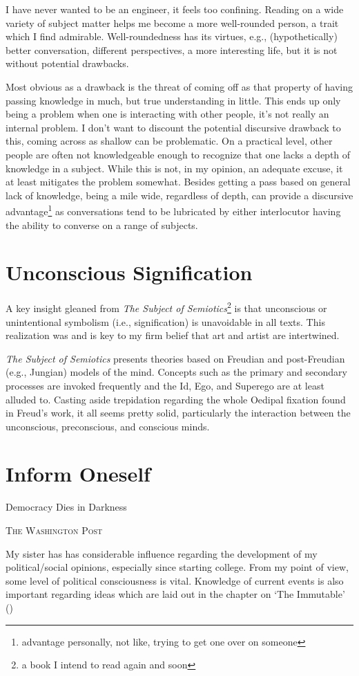 \documentclass[../butidigress.tex]{subfiles}
\begin{document}
I have never wanted to be  an engineer, it feels too confining.
Reading on a wide variety of subject matter helps me become a more well-rounded person, a trait which I find admirable.
Well-roundedness has its virtues, e.g., (hypothetically) better conversation, different perspectives, a more interesting life, but it is not without potential drawbacks.

Most obvious as a drawback is the threat of coming off as  that property of having passing knowledge in much, but true understanding in little.
This ends up only being a problem when one is interacting with other people, it's not really an internal problem.
I don't want to discount the potential discursive drawback to this, coming across as shallow can be problematic.
On a practical level, other people are often not knowledgeable enough to recognize that one lacks a depth of knowledge in a subject.
While this is not, in my opinion, an adequate excuse, it at least mitigates the problem somewhat.
Besides getting a pass based on general lack of knowledge, being a mile wide, regardless of depth, can provide a discursive advantage\footnote{advantage personally, not like, trying to get one over on someone} as conversations tend to be lubricated by either interlocutor having the ability to converse on a range of subjects.

\section{Unconscious Signification}
A key insight gleaned from \textit{The Subject of Semiotics}\footnote{a book I intend to read again and soon} is that unconscious or unintentional symbolism (i.e., signification) is unavoidable in all texts.
This realization was and is key to my firm belief that art and artist are intertwined.

\textit{The Subject of Semiotics} presents theories based on Freudian and post-Freudian (e.g., Jungian) models of the mind.
Concepts such as the primary and secondary processes are invoked frequently and the Id, Ego, and Superego are at least alluded to.
Casting aside trepidation regarding the whole Oedipal fixation found in Freud's work, it all seems pretty solid, particularly the interaction between the unconscious, preconscious, and conscious minds.

\section{Inform Oneself}
\epigraph{Democracy Dies in Darkness}{\textsc{The Washington Post}}
My sister has has considerable influence regarding the development of my political/social opinions, especially since starting college.
From my point of view, some level of political consciousness is vital.
Knowledge of current events is also important regarding ideas which are laid out in the chapter on `The Immutable' (\pageref{chap:immutable})
\end{document}
